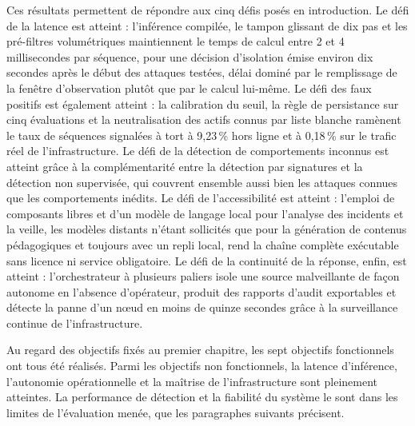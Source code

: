 Ces résultats permettent de répondre aux cinq défis posés en introduction. Le défi de la latence est atteint : l'inférence compilée, le tampon glissant de dix pas et les pré-filtres volumétriques maintiennent le temps de calcul entre 2 et 4 millisecondes par séquence, pour une décision d'isolation émise environ dix secondes après le début des attaques testées, délai dominé par le remplissage de la fenêtre d'observation plutôt que par le calcul lui-même. Le défi des faux positifs est également atteint : la calibration du seuil, la règle de persistance sur cinq évaluations et la neutralisation des actifs connus par liste blanche ramènent le taux de séquences signalées à tort à 9,23\,\% hors ligne et à 0,18\,\% sur le trafic réel de l'infrastructure. Le défi de la détection de comportements inconnus est atteint grâce à la complémentarité entre la détection par signatures et la détection non supervisée, qui couvrent ensemble aussi bien les attaques connues que les comportements inédits. Le défi de l'accessibilité est atteint : l'emploi de composants libres et d'un modèle de langage local pour l'analyse des incidents et la veille, les modèles distants n'étant sollicités que pour la génération de contenus pédagogiques et toujours avec un repli local, rend la chaîne complète exécutable sans licence ni service obligatoire. Le défi de la continuité de la réponse, enfin, est atteint : l'orchestrateur à plusieurs paliers isole une source malveillante de façon autonome en l'absence d'opérateur, produit des rapports d'audit exportables et détecte la panne d'un nœud en moins de quinze secondes grâce à la surveillance continue de l'infrastructure.

Au regard des objectifs fixés au premier chapitre, les sept objectifs fonctionnels ont tous été réalisés. Parmi les objectifs non fonctionnels, la latence d'inférence, l'autonomie opérationnelle et la maîtrise de l'infrastructure sont pleinement atteintes. La performance de détection et la fiabilité du système le sont dans les limites de l'évaluation menée, que les paragraphes suivants précisent.

